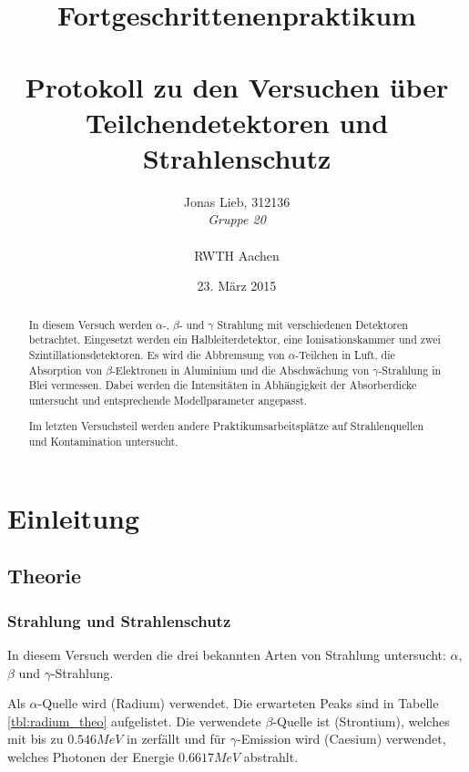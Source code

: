 \documentclass{../Misc/MontavonLaTeX/Montavon}
\date{23. März 2015}
\begin{document}
\title{Fortgeschrittenenpraktikum \\ \quad \\ Protokoll zu den Versuchen über Teilchendetektoren und Strahlenschutz}
\author{Jonas Lieb, 312136 \\ \emph{Gruppe 20} \\ \\  RWTH Aachen}
\maketitle

\begin{abstract}
In diesem Versuch werden $\alpha$-, $\beta$- und $\gamma$ Strahlung mit verschiedenen Detektoren betrachtet. Eingesetzt werden ein Halbleiterdetektor, eine Ionisationskammer und zwei Szintillationsdetektoren. Es wird die Abbremsung von $\alpha$-Teilchen in Luft, die Absorption von $\beta$-Elektronen in Aluminium und die Abschwächung von $\gamma$-Strahlung in Blei vermessen. Dabei werden die Intensitäten in Abhängigkeit der Absorberdicke untersucht und entsprechende Modellparameter angepasst.

Im letzten Versuchsteil werden andere Praktikumsarbeitsplätze auf Strahlenquellen und Kontamination untersucht.
\end{abstract}

\newpage

\setcounter{tocdepth}{2}
\tableofcontents
\newpage

\section{Einleitung}
\subsection{Theorie}
\subsubsection{Strahlung und Strahlenschutz}
In diesem Versuch werden die drei bekannten Arten von Strahlung untersucht: $\alpha$, $\beta$ und $\gamma$-Strahlung. 

Als $\alpha$-Quelle wird  (Radium) verwendet. Die erwarteten Peaks sind in Tabelle \ref{tbl:radium_theo} aufgelistet. Die verwendete $\beta$-Quelle ist  (Strontium), welches mit bis zu $0.546 \unit{MeV}$ in  zerfällt und für $\gamma$-Emission wird  (Caesium) verwendet, welches Photonen der Energie $0.6617 \unit{MeV}$ abstrahlt.
\end{document}
